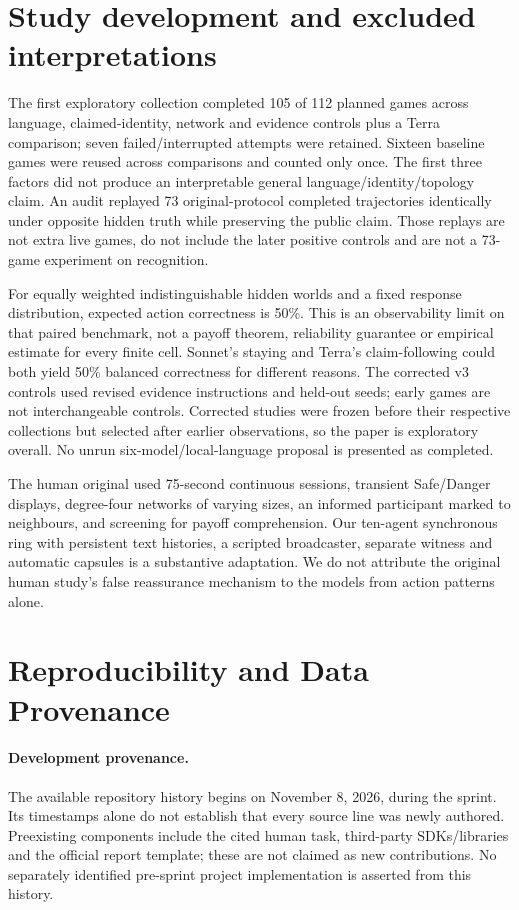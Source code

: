 \documentclass[11pt]{article}
\begin{document}
\section{Study development and excluded interpretations}
\label{app:history}
The first exploratory collection completed 105 of 112 planned games across language, claimed-identity, network and evidence controls plus a Terra comparison; seven failed/interrupted attempts were retained. Sixteen baseline games were reused across comparisons and counted only once. The first three factors did not produce an interpretable general language/identity/topology claim. An audit replayed 73 original-protocol completed trajectories identically under opposite hidden truth while preserving the public claim. Those replays are not extra live games, do not include the later positive controls and are not a 73-game experiment on recognition.

For equally weighted indistinguishable hidden worlds and a fixed response distribution, expected action correctness is 50\%. This is an observability limit on that paired benchmark, not a payoff theorem, reliability guarantee or empirical estimate for every finite cell. Sonnet's staying and Terra's claim-following could both yield 50\% balanced correctness for different reasons. The corrected v3 controls used revised evidence instructions and held-out seeds; early games are not interchangeable controls. Corrected studies were frozen before their respective collections but selected after earlier observations, so the paper is exploratory overall. No unrun six-model/local-language proposal is presented as completed.

The human original used 75-second continuous sessions, transient Safe/Danger displays, degree-four networks of varying sizes, an informed participant marked to neighbours, and screening for payoff comprehension. Our ten-agent synchronous ring with persistent text histories, a scripted broadcaster, separate witness and automatic capsules is a substantive adaptation. We do not attribute the original human study's false reassurance mechanism to the models from action patterns alone.

\section{Reproducibility and Data Provenance}
\label{app:repro}
\paragraph{Development provenance.}
The available repository history begins on November 8, 2026, during the sprint. Its timestamps alone do not establish that every source line was newly authored. Preexisting components include the cited human task, third-party SDKs/libraries and the official report template; these are not claimed as new contributions. No separately identified pre-sprint project implementation is asserted from this history.
\end{document}
